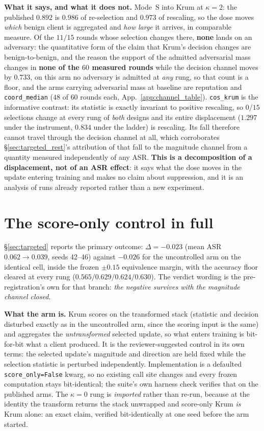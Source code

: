 \documentclass{article}
\begin{document}
\noindent \textbf{What it says, and what it does not.} Mode~S into Krum at $\kappa{=}2$: the published $0.892$ is $0.986$ of re-selection and $0.973$ of rescaling, so the dose moves \emph{which} benign client is aggregated and \emph{how large} it arrives, in comparable measure. Of the $11/15$ rounds whose selection changes there, \textbf{none} lands on an adversary: the quantitative form of the claim that Krum's decision changes are benign-to-benign, and the reason the support of the admitted adversarial mass changes in \textbf{none of the $60$ measured rounds} while the decision channel moves by $0.733$, on this arm no adversary is admitted at \emph{any} rung, so that count is a floor, and the arms carrying adversarial mass at baseline are reputation and \texttt{coord\_median} ($48$ of $60$ rounds each, App.~\ref{app:channel_table}). \texttt{cos\_krum} is the informative contrast: its statistic is exactly invariant to positive rescaling, so $0/15$ selections change at every rung of \emph{both} designs and its entire displacement ($1.297$ under the instrument, $0.834$ under the ladder) is rescaling. Its fall therefore cannot travel through the decision channel at all, which corroborates \S\ref{sec:targeted_rest}'s attribution of that fall to the magnitude channel from a quantity measured independently of any ASR. \textbf{This is a decomposition of a displacement, not of an ASR effect}: it says what the dose moves in the update entering training and makes no claim about suppression, and it is an analysis of runs already reported rather than a new experiment.

\section{The score-only control in full}
\label{app:score_only}

\noindent \S\ref{sec:targeted} reports the primary outcome: $\Delta = -0.023$ (mean ASR $0.062 \to 0.039$, seeds 42--46) against $-0.026$ for the uncontrolled arm on the identical cell, inside the frozen $\pm0.15$ equivalence margin, with the accuracy floor cleared at every rung ($0.565/0.629/0.624/0.630$). The verdict wording is the pre-registration's own for that branch: \emph{the negative survives with the magnitude channel closed}.

\noindent \textbf{What the arm is.} Krum scores on the transformed stack (statistic and decision disturbed exactly as in the uncontrolled arm, since the scoring input is the same) and aggregates the \emph{untransformed} selected update, so what enters training is bit-for-bit what a client produced. It is the reviewer-suggested control in its own terms: the selected update's magnitude and direction are held fixed while the selection statistic is perturbed independently. Implementation is a defaulted \texttt{score\_only=False} kwarg, so no existing call site changes and every frozen computation stays bit-identical; the suite's own harness check verifies that on the published arms. The $\kappa{=}0$ rung is \emph{imported} rather than re-run, because at the identity the transform returns the stack unwrapped and score-only Krum \emph{is} Krum alone: an exact claim, verified bit-identically at one seed before the arm started.
\end{document}
